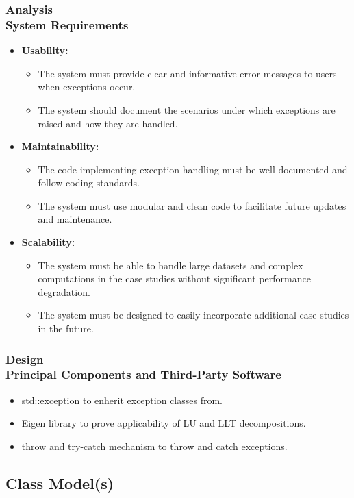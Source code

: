 \documentclass[ucs,10pt]{beamer}
\begin{document}
\begin{frame}
\frametitle{Analysis \\
	\small \color{rwth-blue} System Requirements}
	\begin{itemize}	
            \item \textbf{Usability:}
		\begin{itemize}
			\item The system must provide clear and informative error messages to users when exceptions occur.
			\item The system should document the scenarios under which exceptions are raised and how they are handled.
		\end{itemize}
		\item \textbf{Maintainability:}
		\begin{itemize}
			\item The code implementing exception handling must be well-documented and follow coding standards.
			\item The system must use modular and clean code to facilitate future updates and maintenance.
		\end{itemize}
		\item \textbf{Scalability:}
		\begin{itemize}
			\item The system must be able to handle large datasets and complex computations in the case studies without significant performance degradation.
			\item The system must be designed to easily incorporate additional case studies in the future.
		\end{itemize}
	\end{itemize}
\end{frame}

\begin{frame}
\frametitle{Design \\
	\small \color{rwth-blue} Principal Components and Third-Party Software}
	\begin{itemize}
		\item std::exception to enherit exception classes from.
		\item Eigen library to prove applicability of LU and LLT decompositions.
		\item throw and try-catch mechanism to throw and catch exceptions.
	\end{itemize}
\end{frame}

\subsection{Class Model(s)}
\end{document}
